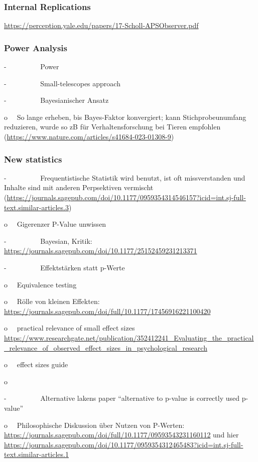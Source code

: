 \documentclass[
  letterpaper,
  DIV=11,
  numbers=noendperiod]{scrreprt}
\begin{document}
\subsubsection{Internal Replications}\label{internal-replications}

\url{https://perception.yale.edu/papers/17-Scholl-APSObserver.pdf}

\subsubsection{Power Analysis}\label{power-analysis}

-~~~~~~~~~ Power

-~~~~~~~~~ Small-telescopes approach

-~~~~~~~~~ Bayesianischer Ansatz

o~~ So lange erheben, bis Bayes-Faktor konvergiert; kann
Stichprobeunumfang reduzieren, wurde so zB für Verhaltensforschung bei
Tieren empfohlen
(\url{https://www.nature.com/articles/s41684-023-01308-9})

\subsubsection{New statistics}\label{new-statistics}

-~~~~~~~~~ Frequentistische Statistik wird benutzt, ist oft
missverstanden und Inhalte sind mit anderen Perpsektiven vermischt
(\url{https://journals.sagepub.com/doi/10.1177/0959354314546157?icid=int.sj-full-text.similar-articles.3})

o~~ Gigerenzer P-Value unwissen

-~~~~~~~~~ Bayesian, Kritik:
\url{https://journals.sagepub.com/doi/10.1177/25152459231213371}

-~~~~~~~~~ Effektstärken statt p-Werte

o~~ Equivalence testing

o~~ Rölle von kleinen Effekten:
\url{https://journals.sagepub.com/doi/full/10.1177/17456916221100420}

o~~ practical relevance of small effect sizes
\url{https://www.researchgate.net/publication/352412241_Evaluating_the_practical_relevance_of_observed_effect_sizes_in_psychological_research}

o~~ effect sizes guide

o~~ ~

-~~~~~~~~~ Alternative lakens paper ``alternative to p-value is
correctly used p-value''

o~~ Philosophische Diskussion über Nutzen von P-Werten:
\url{https://journals.sagepub.com/doi/full/10.1177/09593543231160112}
und hier
\url{https://journals.sagepub.com/doi/10.1177/0959354312465483?icid=int.sj-full-text.similar-articles.1}
\end{document}
